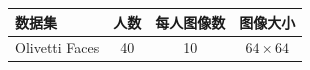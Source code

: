 \begin{tabular}{lccc}
\toprule
数据集 & 人数 & 每人图像数 & 图像大小 \\
\midrule
Olivetti Faces & 40 & 10 & $64\times64$ \\
\bottomrule
\end{tabular}
